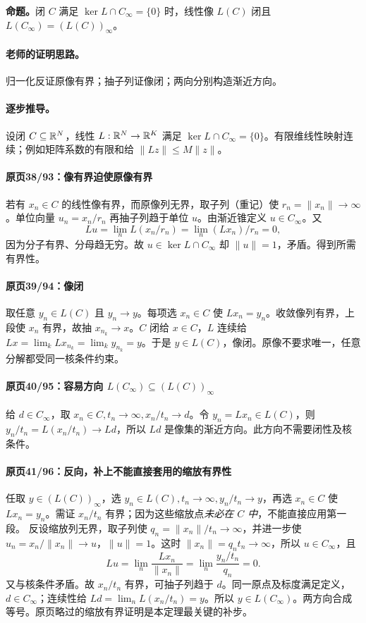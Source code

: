 \textbf{命题。}闭 $C$ 满足 $\ker L\cap C_\infty=\{0\}$ 时，线性像 $L(C)$ 闭且 $L(C_\infty)=(L(C))_\infty$。

\paragraph{老师的证明思路。}归一化反证原像有界；抽子列证像闭；两向分别构造渐近方向。

\paragraph{逐步推导。}
设闭 $C\subseteq\mathbb{R}^N$，线性 $L:\mathbb{R}^N\to\mathbb{R}^K$ 满足 $\ker L\cap C_\infty=\{0\}$。有限维线性映射连续；例如矩阵系数的有限和给 $\|Lz\|\le M\|z\|$。
\paragraph{原页38/93：像有界迫使原像有界}
若有 $x_n\in C$ 的线性像有界，而原像列无界，取子列（重记）使 $r_n=\|x_n\|\to\infty$。单位向量 $u_n=x_n/r_n$ 再抽子列趋于单位 $u$。由渐近锥定义 $u\in C_\infty$。又
\[Lu=\lim_n L(x_n/r_n)=\lim_n(Lx_n)/r_n=0,\]
因为分子有界、分母趋无穷。故 $u\in\ker L\cap C_\infty$ 却 $\|u\|=1$，矛盾。得到所需有界性。
\paragraph{原页39/94：像闭}
取任意 $y_n\in L(C)$ 且 $y_n\to y$。每项选 $x_n\in C$ 使 $Lx_n=y_n$。收敛像列有界，上段使 $x_n$ 有界，故抽 $x_{n_k}\to x$。$C$ 闭给 $x\in C$，$L$ 连续给 $Lx=\lim_kLx_{n_k}=\lim_ky_{n_k}=y$。于是 $y\in L(C)$，像闭。原像不要求唯一，任意分解都受同一核条件约束。
\paragraph{原页40/95：容易方向 $L(C_\infty)\subseteq(L(C))_\infty$}
给 $d\in C_\infty$，取 $x_n\in C,t_n\to\infty,x_n/t_n\to d$。令 $y_n=Lx_n\in L(C)$，则 $y_n/t_n=L(x_n/t_n)\to Ld$，所以 $Ld$ 是像集的渐近方向。此方向不需要闭性及核条件。
\paragraph{原页41/96：反向，补上不能直接套用的缩放有界性}
任取 $y\in(L(C))_\infty$，选 $y_n\in L(C),t_n\to\infty,y_n/t_n\to y$，再选 $x_n\in C$ 使 $Lx_n=y_n$。需证 $x_n/t_n$ 有界；因为这些缩放点\emph{未必在 $C$ 中}，不能直接应用第一段。
反设缩放列无界，取子列使 $q_n=\|x_n\|/t_n\to\infty$，并进一步使 $u_n=x_n/\|x_n\|\to u$，$\|u\|=1$。这时 $\|x_n\|=q_nt_n\to\infty$，所以 $u\in C_\infty$，且
\[Lu=\lim_n\frac{Lx_n}{\|x_n\|}=\lim_n\frac{y_n/t_n}{q_n}=0.\]
又与核条件矛盾。故 $x_n/t_n$ 有界，可抽子列趋于 $d$。同一原点及标度满足定义，$d\in C_\infty$；连续性给 $Ld=\lim_nL(x_n/t_n)=y$。所以 $y\in L(C_\infty)$。两方向合成等号。原页略过的缩放有界证明是本定理最关键的补步。


